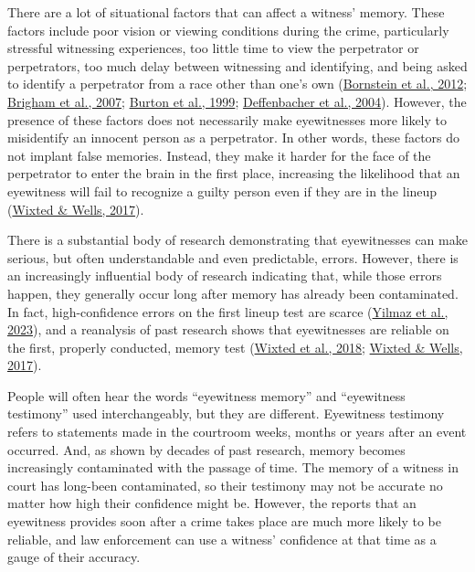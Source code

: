 \documentclass[
]{krantz}
\begin{document}
There are a lot of situational factors that can affect a witness' memory. These factors include poor vision or viewing conditions during the crime, particularly stressful witnessing experiences, too little time to view the perpetrator or perpetrators, too much delay between witnessing and identifying, and being asked to identify a perpetrator from a race other than one's own (\protect\hyperlink{ref-bornstein2012effects}{Bornstein et al., 2012}; \protect\hyperlink{ref-brigham2007influence}{Brigham et al., 2007}; \protect\hyperlink{ref-burton1999face}{Burton et al., 1999}; \protect\hyperlink{ref-deffenbacher2004meta}{Deffenbacher et al., 2004}). However, the presence of these factors does not necessarily make eyewitnesses more likely to misidentify an innocent person as a perpetrator. In other words, these factors do not implant false memories. Instead, they make it harder for the face of the perpetrator to enter the brain in the first place, increasing the likelihood that an eyewitness will fail to recognize a guilty person even if they are in the lineup (\protect\hyperlink{ref-wixted2017relationship}{Wixted \& Wells, 2017}).

There is a substantial body of research demonstrating that eyewitnesses can make serious, but often understandable and even predictable, errors. However, there is an increasingly influential body of research indicating that, while those errors happen, they generally occur long after memory has already been contaminated. In fact, high-confidence errors on the first lineup test are scarce (\protect\hyperlink{ref-yilmaz2023principles}{Yilmaz et al., 2023}), and a reanalysis of past research shows that eyewitnesses are reliable on the first, properly conducted, memory test (\protect\hyperlink{ref-wixted2018rethinking}{Wixted et al., 2018}; \protect\hyperlink{ref-wixted2017relationship}{Wixted \& Wells, 2017}).

People will often hear the words ``eyewitness memory'' and ``eyewitness testimony'' used interchangeably, but they are different. Eyewitness testimony refers to statements made in the courtroom weeks, months or years after an event occurred. And, as shown by decades of past research, memory becomes increasingly contaminated with the passage of time. The memory of a witness in court has long-been contaminated, so their testimony may not be accurate no matter how high their confidence might be. However, the reports that an eyewitness provides soon after a crime takes place are much more likely to be reliable, and law enforcement can use a witness' confidence at that time as a gauge of their accuracy.
\end{document}
